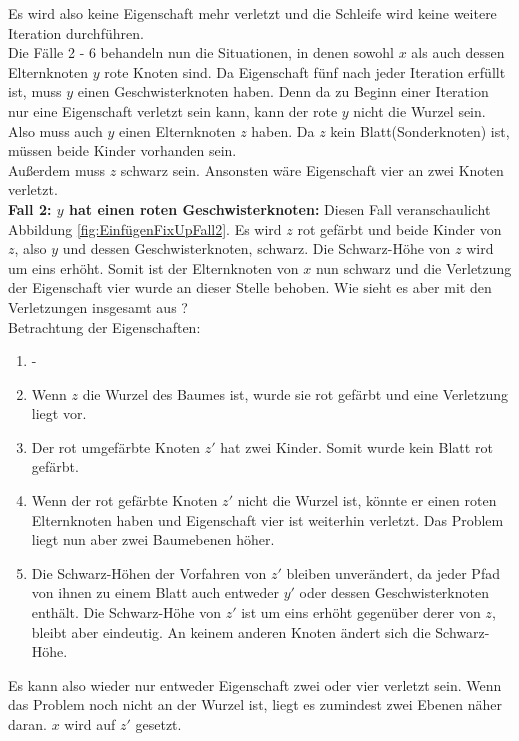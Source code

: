 \documentclass[a4paper,12pt]{article}
\begin{document}
\noindent Es wird also keine Eigenschaft mehr verletzt und die Schleife wird keine weitere Iteration durchführen.\\
Die Fälle 2 - 6 behandeln nun die Situationen, in denen sowohl $x$ als auch dessen Elternknoten $y$ rote Knoten sind. Da Eigenschaft fünf nach jeder Iteration erfüllt ist, muss $y$ einen Geschwisterknoten haben. Denn da zu Beginn einer Iteration nur eine Eigenschaft verletzt sein kann, kann der rote $y$ nicht die Wurzel sein. Also muss auch $y$ einen Elternknoten $z$ haben. Da $z$ kein Blatt(Sonderknoten) ist, müssen beide Kinder vorhanden sein.\\
Außerdem muss $z$ schwarz sein. Ansonsten wäre Eigenschaft vier an zwei Knoten verletzt.\\

\noindent\textbf{Fall 2: $y$ hat einen roten Geschwisterknoten: } \label{if2}
\noindent Diesen Fall veranschaulicht Abbildung \ref{fig:EinfügenFixUpFall2}. Es wird $z$ rot gefärbt und beide Kinder von $z$, also $y$ und dessen Geschwisterknoten, schwarz. Die Schwarz-Höhe von $z$ wird um eins erhöht. Somit ist der Elternknoten von $x$ nun schwarz und die Verletzung der Eigenschaft vier wurde an dieser Stelle behoben. Wie sieht es aber mit den Verletzungen insgesamt aus ? \\

Betrachtung der Eigenschaften:

\begin{enumerate}
	\item -
	\item Wenn $z$ die Wurzel des Baumes ist, wurde sie rot gefärbt und eine Verletzung liegt vor.
	\item Der rot umgefärbte Knoten $z'$ hat zwei Kinder. Somit wurde kein Blatt rot gefärbt.
	\item  Wenn der rot gefärbte Knoten $z'$ nicht die Wurzel ist, könnte er einen roten Elternknoten haben und Eigenschaft vier ist weiterhin verletzt. Das Problem liegt nun aber zwei Baumebenen höher.
	\item  Die Schwarz-Höhen der Vorfahren von $z'$ bleiben unverändert, da jeder Pfad von ihnen zu einem Blatt auch entweder $y'$ oder dessen Geschwisterknoten enthält. Die Schwarz-Höhe von $z'$ ist um eins erhöht gegenüber derer von $z$, bleibt aber eindeutig. An keinem anderen Knoten ändert sich die Schwarz-Höhe. 
	
\end{enumerate} 
Es kann also wieder nur entweder Eigenschaft zwei oder vier verletzt sein. Wenn das Problem noch nicht an der Wurzel ist, liegt es zumindest zwei Ebenen näher daran. $x$ wird auf $z'$ gesetzt. 
\end{document}
